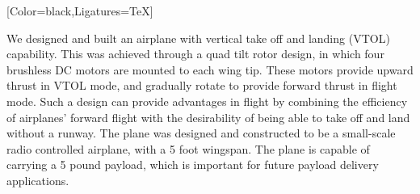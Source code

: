 \documentclass{article}
\begin{document}
\begin{minipage}{16.4in}
{
	[Color=black,Ligatures=TeX]
	\fontsize{0.58in}{6em}\selectfont

	We designed and built an airplane with vertical take off and landing (VTOL)
	capability. This was achieved through a quad tilt rotor design, in which
	four brushless DC motors are mounted to each wing tip. These motors
	provide upward thrust in VTOL mode, and gradually rotate to provide
	forward thrust in flight mode. Such a design can provide advantages in
	flight by combining the efficiency of airplanes' forward flight with the
	desirability of being able to take off and land without a runway. The
	plane was designed and constructed to be a small-scale radio controlled
	airplane, with a 5 foot wingspan. The plane is capable of carrying a 5
	pound payload, which is important for future payload delivery
	applications.

}
\end{minipage}  
\end{document}
